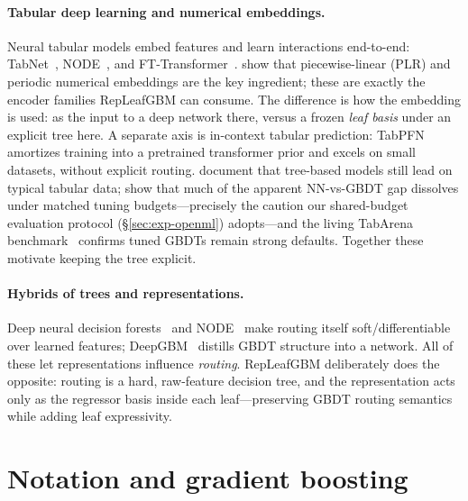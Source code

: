 \documentclass[11pt]{article}
\begin{document}
\paragraph{Tabular deep learning and numerical embeddings.}
Neural tabular models embed features and learn interactions end-to-end:
TabNet~\citep{arik2021tabnet}, NODE~\citep{popov2020node}, and
FT-Transformer~\citep{gorishniy2021revisiting}. \citet{gorishniy2022embeddings} show
that piecewise-linear (PLR) and periodic numerical embeddings are the key ingredient;
these are exactly the encoder families RepLeafGBM can consume. The difference is how
the embedding is used: as the input to a deep network there, versus a frozen
\emph{leaf basis} under an explicit tree here. A separate axis is in-context tabular
prediction: TabPFN~\citep{hollmann2025tabpfn} amortizes training into a pretrained
transformer prior and excels on small datasets, without explicit routing.
\citet{grinsztajn2022why} document that tree-based models still lead on typical tabular
data; \citet{mcelfresh2023when} show that much of the apparent NN-vs-GBDT gap dissolves
under matched tuning budgets---precisely the caution our shared-budget evaluation
protocol (\S\ref{sec:exp-openml}) adopts---and the living TabArena
benchmark~\citep{erickson2025tabarena} confirms tuned GBDTs remain strong defaults.
Together these motivate keeping the tree explicit.

\paragraph{Hybrids of trees and representations.}
Deep neural decision forests~\citep{kontschieder2015deep} and NODE~\citep{popov2020node}
make routing itself soft/differentiable over learned features; DeepGBM~\citep{ke2019deepgbm}
distills GBDT structure into a network. All of these let representations influence
\emph{routing}. RepLeafGBM deliberately does the opposite: routing is a hard,
raw-feature decision tree, and the representation acts only as the regressor basis
inside each leaf---preserving GBDT routing semantics while adding leaf expressivity.

\section{Notation and gradient boosting}
\label{sec:notation}
\end{document}

